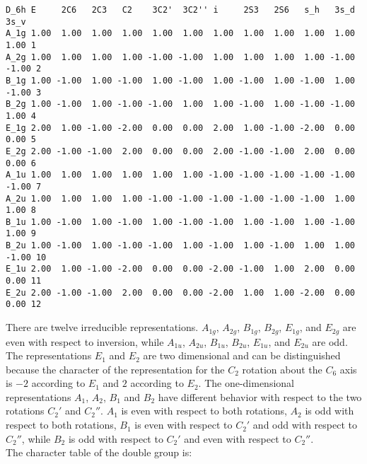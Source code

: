 \documentclass[12pt,a4paper,twoside]{report}
\begin{document}
\begin{tcolorbox}
\begin{scriptsize}
\begin{verbatim}
D_6h E     2C6   2C3   C2    3C2'  3C2'' i     2S3   2S6   s_h   3s_d  3s_v 
A_1g 1.00  1.00  1.00  1.00  1.00  1.00  1.00  1.00  1.00  1.00  1.00  1.00 1
A_2g 1.00  1.00  1.00  1.00 -1.00 -1.00  1.00  1.00  1.00  1.00 -1.00 -1.00 2
B_1g 1.00 -1.00  1.00 -1.00  1.00 -1.00  1.00 -1.00  1.00 -1.00  1.00 -1.00 3
B_2g 1.00 -1.00  1.00 -1.00 -1.00  1.00  1.00 -1.00  1.00 -1.00 -1.00  1.00 4
E_1g 2.00  1.00 -1.00 -2.00  0.00  0.00  2.00  1.00 -1.00 -2.00  0.00  0.00 5
E_2g 2.00 -1.00 -1.00  2.00  0.00  0.00  2.00 -1.00 -1.00  2.00  0.00  0.00 6
A_1u 1.00  1.00  1.00  1.00  1.00  1.00 -1.00 -1.00 -1.00 -1.00 -1.00 -1.00 7
A_2u 1.00  1.00  1.00  1.00 -1.00 -1.00 -1.00 -1.00 -1.00 -1.00  1.00  1.00 8
B_1u 1.00 -1.00  1.00 -1.00  1.00 -1.00 -1.00  1.00 -1.00  1.00 -1.00  1.00 9
B_2u 1.00 -1.00  1.00 -1.00 -1.00  1.00 -1.00  1.00 -1.00  1.00  1.00 -1.00 10
E_1u 2.00  1.00 -1.00 -2.00  0.00  0.00 -2.00 -1.00  1.00  2.00  0.00  0.00 11
E_2u 2.00 -1.00 -1.00  2.00  0.00  0.00 -2.00  1.00  1.00 -2.00  0.00  0.00 12
\end{verbatim}
\end{scriptsize}
\end{tcolorbox}


There are twelve irreducible representations. $A_{1g}$, $A_{2g}$, $B_{1g}$, 
$B_{2g}$, $E_{1g}$, and $E_{2g}$ are even with respect to inversion, while
$A_{1u}$, $A_{2u}$, $B_{1u}$, $B_{2u}$, $E_{1u}$, and $E_{2u}$ are odd.
The representations $E_1$ and $E_2$ are two dimensional and can be
distinguished because the character of the representation for the $C_2$ 
rotation about the $C_6$ axis is $-2$ according to $E_1$ and $2$ according
to $E_2$. The one-dimensional representations $A_1$, $A_2$, $B_1$ and
$B_2$ have different behavior with respect to the two rotations $C_2'$ and
$C_2''$. $A_1$ is even with respect to both rotations, $A_2$ is odd with
respect to both rotations, $B_1$ is even with respect to $C_2'$ and odd with
respect to $C_2''$, while $B_2$ is odd with respect to $C_2'$ and even with
respect to $C_2''$. \\
The character table of the double group is:
\end{document}
